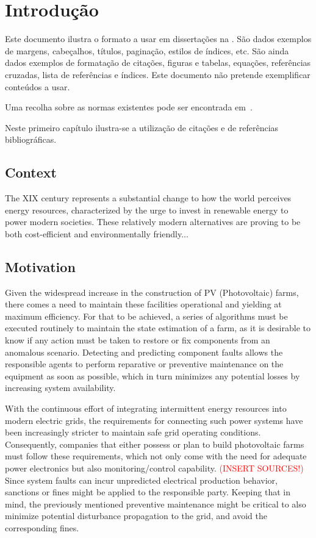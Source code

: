 \chapter{Introdução} \label{chap:intro}

Este documento ilustra o formato a usar em dissertações na \Feup.
São dados exemplos de margens, cabeçalhos, títulos, paginação, estilos
de índices, etc. 
São ainda dados exemplos de formatação de citações, figuras e tabelas,
equações, referências cruzadas, lista de referências e índices.
Este documento não pretende exemplificar conteúdos a usar.

Uma recolha sobre as normas existentes pode ser encontrada em~\citet{kn:Mat93}.

Neste primeiro capítulo ilustra-se a utilização de citações e de
referências bibliográficas.

\section{Context} \label{sec:context}

The XIX century represents a substantial change to how the world perceives
energy resources, characterized by the urge to invest in renewable energy to 
power modern societies. These relatively modern alternatives are
proving to be both cost-efficient and environmentally friendly...

\section{Motivation} \label{sec:motivation}

Given the widespread increase in the construction of PV (Photovoltaic) farms, there
comes a need to maintain these facilities operational and yielding at maximum
efficiency. For that to be achieved, a series of algorithms must be executed
routinely to maintain the state estimation of a farm, as it is
desirable to know if any action must be taken to restore or fix components from
an anomalous scenario. Detecting and predicting component faults allows the
responsible agents to perform reparative or preventive maintenance on the
equipment as soon as possible, which in turn minimizes any potential losses by
increasing system availability.

With the continuous effort of integrating intermittent energy resources into
modern electric grids, the requirements for connecting such power systems have
been increasingly stricter to maintain safe grid operating conditions.
Consequently, companies that either possess or plan to build photovoltaic farms
must follow these requirements, which not only come with the need for adequate
power electronics but also monitoring/control capability.
\textcolor{red}{(INSERT SOURCES!)}
Since system faults can incur unpredicted electrical production behavior,
sanctions or fines might be applied to the responsible party. Keeping that in
mind, the previously mentioned preventive maintenance might be critical to also
minimize potential disturbance propagation to the grid, and avoid the
corresponding fines.

